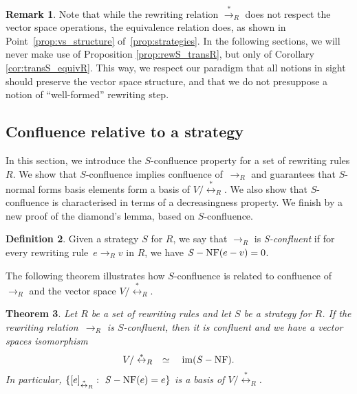 \documentclass[11pt]{article}
\newtheorem{theorem}{Theorem}[section]
\theoremstyle{definition}
\newtheorem{definition}[theorem]{Definition}
\newtheorem{remark}[theorem]{Remark}
\DeclareMathOperator{\im}{im}
\newcommand\rewR{\to_R}
\newcommand\transR{\overset{*}{\to}_R}
\newcommand\equivR{\overset{*}{\leftrightarrow}_R}
\DeclareMathOperator{\SNF}{{\it S}-NF}
\begin{document}
\begin{remark}
  Note that while the rewriting relation $\transR$ does not respect the
  vector space operations, the equivalence relation does, as shown
  in Point~\ref{prop:vs_structure} of~\ref{prop:strategies}.  In the
  following sections, we will
  never make use of Proposition \ref{prop:rewS_transR}, but only of Corollary
  \ref{cor:transS_equivR}. This way, we respect our paradigm that all notions in
  sight should preserve the vector space structure, and that we do not
  presuppose a notion of ``well-formed'' rewriting step.
\end{remark}


\subsection{Confluence relative to a strategy}
\label{sec:confluence_relative_to_a_strategy}

In this section, we introduce the $S$-confluence property for a set of
rewriting rules $R$. We show that $S$-confluence implies confluence
of~$\rewR$ and guarantees that $S$-normal forms basis elements form a
basis of $V/\equivR$. We also show that $S$-confluence is characterised
in terms of a decreasingness property. We finish by a new proof of the
diamond's lemma, based on $S$-confluence. 
\smallskip

\begin{definition}\label{def:standardisation_property}
  Given a strategy $S$ for $R$, we say that $\rewR$ is \emph{S-confluent}
  if for every rewriting rule~$e\rewR v$ in $R$, we have $\SNF(e-v)=0$.
\end{definition}
\smallskip

The following theorem illustrates how $S$-confluence is related to
confluence of $\rewR$ and the vector space $V/\equivR$.
\medskip

\begin{theorem}\label{thm:S-confluence_criterion}
  Let $R$ be a set of rewriting rules and let $S$ be a strategy for $R$.
  If the rewriting relation~$\rewR$ is $S$-confluent, then it is
  confluent and we have a vector spaces isomorphism
  \begin{equation}\label{equ:iso_SNF}
    V/\equivR\quad\simeq\quad\im(\SNF).
  \end{equation}
  In particular, $\{[e]_{\equivR}:\ \SNF(e)=e\}$ is a basis of
  $V/\equivR$.
\end{theorem}
\end{document}
